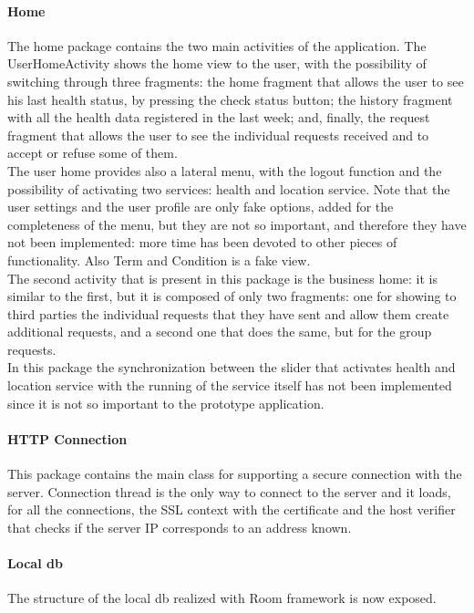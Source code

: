 \paragraph{Home}
The home package contains the two main activities of the application. 
The UserHomeActivity shows the home view to the user, with the possibility of switching through three fragments: the home fragment that allows
the user to see his last health status, by pressing the check status button; the history fragment with all the health data registered in the 
last week; and, finally, the request fragment that allows the user to see the individual requests received and to accept or refuse some of
them. \\
The user home provides also a lateral menu, with the logout function and the possibility of activating two services: health and location
service. 
Note that the user settings and the user profile are only fake options, added for the completeness of the menu, but they are not so important,
and therefore they have not been implemented: more time has been devoted to other pieces of functionality. Also Term and Condition is a fake view. \\
The second activity that is present in this package is the business home: it is similar to the first, but it is composed of only two
fragments: one for showing to third parties the individual requests that they have sent and allow them create additional requests, and a
second one that does the same, but for the group requests.\\
In this package the synchronization between the slider that activates health and location service with the running of the service itself has
not been implemented since it is not so important to the prototype application.

\paragraph{HTTP Connection}
This package contains the main class for supporting a secure connection with the server. 
Connection thread is the only way to connect to the server and it loads, for all the connections, the SSL context with the certificate and the 
host verifier that checks if the server IP corresponds to an address known. 

\paragraph{Local db}
The structure of the local db realized with Room framework is now exposed.

